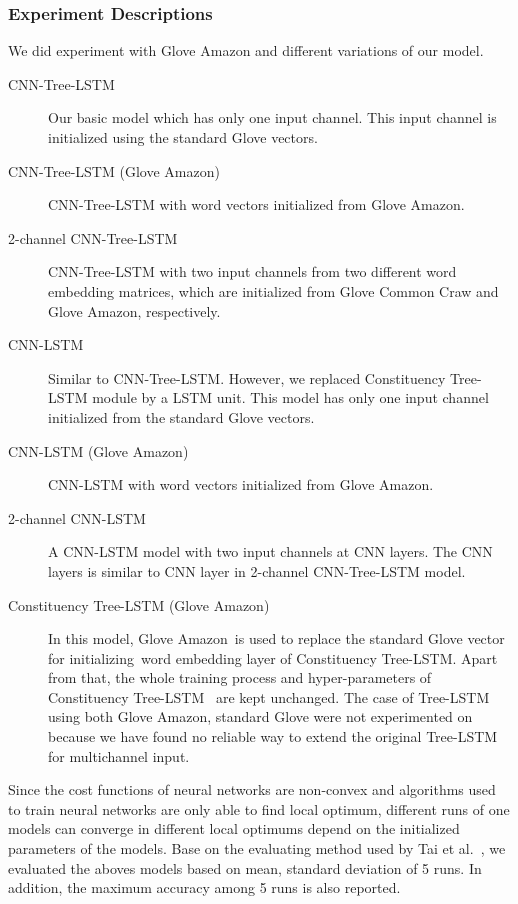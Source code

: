 \subsubsection{Experiment Descriptions}
We did experiment with Glove Amazon and different variations of our model.
\begin{description}
	\item[CNN-Tree-LSTM] Our basic model which has only one input channel.
	This input channel is initialized using the standard Glove vectors.
	\item[CNN-Tree-LSTM (Glove Amazon)] CNN-Tree-LSTM with word vectors initialized from Glove Amazon.
	\item [2-channel CNN-Tree-LSTM] CNN-Tree-LSTM with two input channels from two different word embedding matrices, which are initialized from Glove Common Craw and Glove Amazon, respectively.
	\item[CNN-LSTM] Similar to CNN-Tree-LSTM. However, we replaced Constituency Tree-LSTM module by a LSTM unit.
	This model has only one input channel initialized from the standard Glove vectors.
	\item [CNN-LSTM (Glove Amazon)] CNN-LSTM with word vectors initialized from Glove Amazon.
	\item [2-channel CNN-LSTM] A CNN-LSTM model with two input channels at CNN layers. The CNN layers is similar to CNN layer in 2-channel CNN-Tree-LSTM model.
	\item[Constituency Tree-LSTM (Glove Amazon)] In this model, Glove Amazon~is used to replace the standard Glove vector for initializing~word embedding layer of Constituency Tree-LSTM.
	Apart from that, the whole training process and hyper-parameters of Constituency Tree-LSTM~\cite{treeLSTM} are kept unchanged.
	The case of Tree-LSTM using both Glove Amazon, standard Glove were not experimented on because we have found no reliable way to extend the original Tree-LSTM for multichannel input.
\end{description}

Since the cost functions of neural networks are non-convex and algorithms used to train neural networks are only able to find local optimum, different runs of one models can converge in different local optimums depend on the initialized parameters of the models.  
Base on the evaluating method used by Tai et al.~\cite{treeLSTM}, we evaluated the aboves models based on mean, standard deviation of 5 runs.
In addition, the maximum accuracy among 5 runs is also reported.

